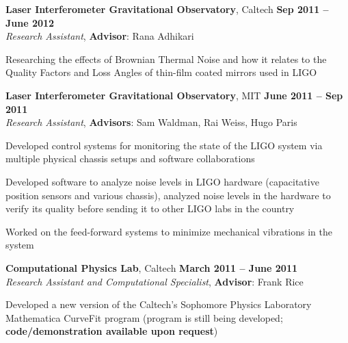 \documentclass[margin,line]{resume}
\begin{document}
\begin{resume}

\textbf{Laser Interferometer Gravitational Observatory}, Caltech \hfill \textbf{Sep 2011 -- June 2012}\\
\textsl{Research Assistant}, \textbf{Advisor}: Rana Adhikari
\begin{list2}
  \item Researching the effects of Brownian Thermal Noise and how it relates to the Quality Factors and Loss Angles of thin-film coated mirrors used in LIGO
\end{list2}

\textbf{Laser Interferometer Gravitational Observatory}, MIT \hfill \textbf{June 2011 -- Sep 2011}\\
\textsl{Research Assistant}, \textbf{Advisors}: Sam Waldman, Rai Weiss, Hugo Paris
\begin{list2}
  \item Developed control systems for monitoring the state of the LIGO system via multiple physical chassis setups and software collaborations
  \item Developed software to analyze noise levels in LIGO hardware (capacitative position sensors and various chassis), analyzed noise levels in the hardware to verify its quality before sending it to other LIGO labs in the country
  \item Worked on the feed-forward systems to minimize mechanical vibrations in the system
\end{list2}

\textbf{Computational Physics Lab}, Caltech \hfill \textbf{March 2011 -- June 2011}\\
\textsl{Research Assistant and Computational Specialist}, \textbf{Advisor}: Frank Rice
\begin{list2}
  \item Developed a new version of the Caltech's Sophomore Physics Laboratory Mathematica CurveFit program (program is still being developed; \textbf{code/demonstration available upon request})
\end{list2}


\end{resume}
\end{document}
